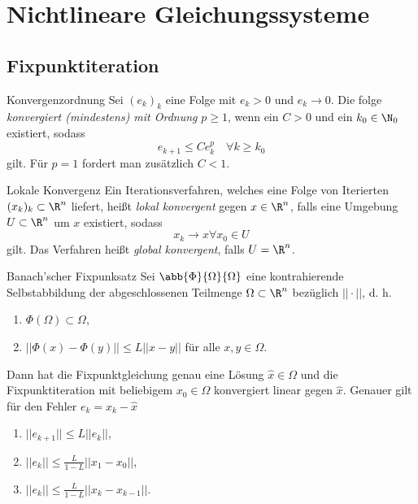\setcounter{section}{4}
\section{Nichtlineare Gleichungssysteme}
\subsection{Fixpunktiteration}

\begin{karte}{Konvergenzordnung}
    Sei \( (e_k)_k \) eine Folge 
    mit \(e_k > 0 \) und \(e_k \rightarrow 0\).
    Die folge \textit{konvergiert (mindestens) mit Ordnung } \(p \geq 1\), 
    wenn ein \(C > 0\) und ein \(k_0 \in \N_0\) existiert, sodass 
    \[ e_{k+1} \leq C e_k^p \quad \forall k\geq k_0 \]
    gilt. Für \(p = 1\) fordert man zusätzlich \(C < 1\).
\end{karte}

\begin{karte}{Lokale Konvergenz}
    Ein Iterationsverfahren, welches eine Folge von Iterierten 
    \( (x_k)_k \subset \R^n \) liefert, heißt \textit{lokal konvergent}
    gegen \(x\in \R^n\), falls eine Umgebung \(U \subset \R^n\) um \(x\) 
    existiert, sodass 
    \[ x_k \rightarrow x \forall x_0 \in U \]
    gilt. Das Verfahren heißt \textit{global konvergent}, falls \( U = \R^n \). 
\end{karte}

\begin{karte}{Banach'scher Fixpunksatz}
    Sei \( \abb{\Phi}{\Omega}{\Omega} \) eine kontrahierende 
    Selbstabbildung der abgeschlossenen Teilmenge \( \Omega \subset \R^n \) 
    bezüglich \( || \cdot || \), d. h. 
    \begin{enumerate}
        \item \( \Phi(\Omega) \subset \Omega \),
        \item \( ||\Phi(x) - \Phi(y)|| \leq L ||x-y|| \) für alle \( x,y \in \Omega \).
    \end{enumerate}
    Dann hat die Fixpunktgleichung genau eine Lösung \( \widehat{x} \in \Omega \) 
    und die Fixpunktiteration mit beliebigem \(x_0 \in \Omega\) konvergiert linear gegen \( \widehat{x} \).
    Genauer gilt für den Fehler \( e_k = x_k - \widehat{x} \)
    \begin{enumerate}
        \item \( ||e_{k+1}|| \leq L ||e_k || \),
        \item \( ||e_k|| \leq \frac{L}{1-L} ||x_1 - x_0 || \),
        \item \( ||e_k|| \leq \frac{L}{1-L} ||x_k - x_{k-1}|| \).
    \end{enumerate}
\end{karte}

